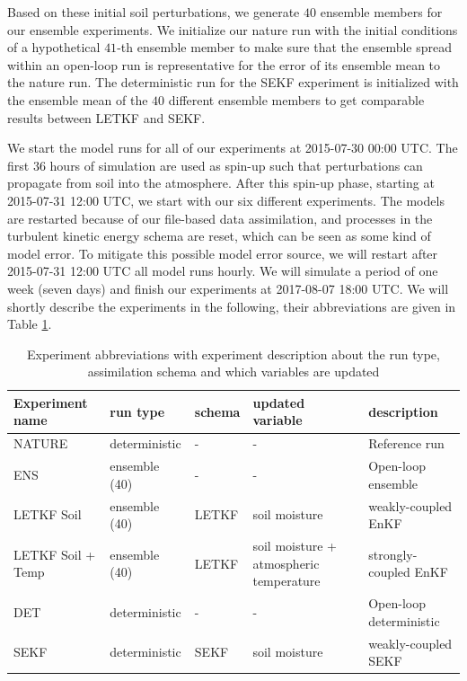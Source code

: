 \documentclass[hess, manuscript]{copernicus}
\begin{document}
Based on these initial soil perturbations, we generate $40$ ensemble members for our ensemble experiments.
We initialize our nature run with the initial conditions of a hypothetical $41$-th ensemble member to make sure that the ensemble spread within an open-loop run is representative for the error of its ensemble mean to the nature run.
The deterministic run for the SEKF experiment is initialized with the ensemble mean of the $40$ different ensemble members to get comparable results between LETKF and SEKF.

We start the model runs for all of our experiments at 2015-07-30 00:00 UTC.
The first $36$ hours of simulation are used as spin-up such that perturbations can propagate from soil into the atmosphere.
After this spin-up phase, starting at 2015-07-31 12:00 UTC, we start with our six different experiments.
The models are restarted because of our file-based data assimilation, and processes in the turbulent kinetic energy schema are reset, which can be seen as some kind of model error.
To mitigate this possible model error source, we will restart after 2015-07-31 12:00 UTC all model runs hourly.
We will simulate a period of one week (seven days) and finish our experiments at 2017-08-07 18:00 UTC.
We will shortly describe the experiments in the following, their abbreviations are given in Table \ref{tab:exp_desc}.\\

\begin{table}[ht]
	\caption{
		Experiment abbreviations with experiment description about the run type, assimilation schema and which variables are updated\label{tab:exp_desc}
	}
	\begin{tabular}{l|l|l|l|l}
		Experiment name & run type & schema & updated variable & description\\
		\hline
		NATURE & deterministic & - & - & Reference run\\
		ENS & ensemble (40) & - & - & Open-loop ensemble\\
		LETKF Soil & ensemble (40) & LETKF & soil moisture & weakly-coupled EnKF\\
		LETKF Soil + Temp & ensemble (40) & LETKF & soil moisture + atmospheric temperature & strongly-coupled EnKF\\
		DET & deterministic & - & - & Open-loop deterministic\\
		SEKF & deterministic & SEKF & soil moisture & weakly-coupled SEKF
	\end{tabular}
\end{table}
\end{document}
